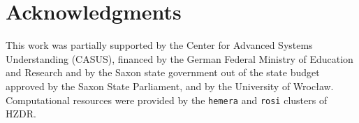 \section*{Acknowledgments}

This work was partially supported by the Center for Advanced Systems Understanding (CASUS), financed by the German Federal Ministry of Education and Research and by the Saxon state government out of the state budget approved by the Saxon State Parliament, and by the University of Wroc\l aw. Computational resources were provided by the \texttt{hemera} and \texttt{rosi} clusters of HZDR.
